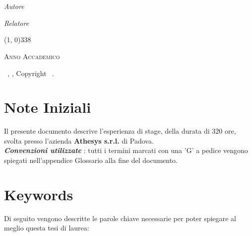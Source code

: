 \documentclass[12pt,a4paper,twoside,openany,english]{book}
\begin{document}
\begin{titlepage}
\begin{center}
		\LARGE{\textsc{\textbf{\myTitle}}}\\
		\large{\mySubTitle}\\
		\vfill
		\begin{minipage}{0.4\textwidth}
			\begin{flushleft} \large
				\emph{Autore}\\
				\myName
			\end{flushleft}
		\end{minipage}
		\hfill
		\begin{minipage}{0.4\textwidth}
			\begin{flushright} \large
				\emph{Relatore} \\
				\myProf
			\end{flushright}
		\end{minipage}
		\vfill
		\line(1, 0){338} \\
		\begin{normalsize}
			\textsc{Anno Accademico \myAA}
		\end{normalsize}
	\end{center}
\end{titlepage}

\thispagestyle{empty}
\hfill
\vfill
\noindent \myName\ \textit{\myTitle,} \myDegree, Copyright \textcopyright\ \myTime.

\cleardoublepage

\chapter*{Note Iniziali}\label{notes}
Il presente documento descrive l'esperienza di stage, della durata di 320 ore, svolta presso l'azienda \textbf{Athesys s.r.l.} di Padova.\\

\textit{\textbf{Convenzioni utilizzate}} : tutti i termini marcati con una 'G' a
pedice vengono spiegati nell'appendice Glossario alla fine del documento.\\
\chapter*{Keywords}\label{keywords}
Di seguito vengono descritte le parole chiave necessarie per poter spiegare al meglio questa tesi di laurea:
\end{document}
